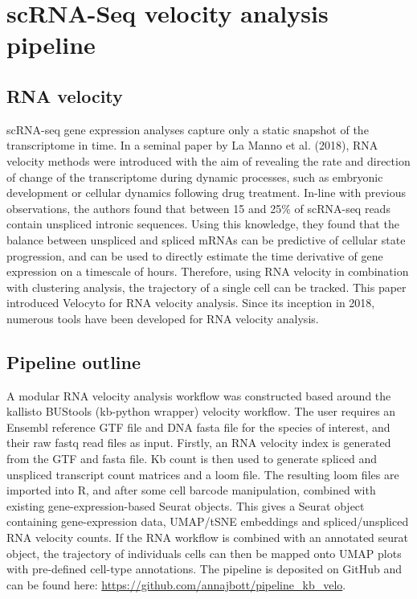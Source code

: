 \afterpage{\clearpage}
\section{scRNA-Seq velocity analysis pipeline}

\subsection{RNA velocity}
scRNA-seq gene expression analyses capture only a static snapshot of the transcriptome in time.
In a seminal paper by La Manno et al. (2018), RNA velocity methods were introduced with the aim of revealing the rate and direction of change of the transcriptome during dynamic processes, such as embryonic development or cellular dynamics following drug treatment\cite{la2018rna}.
In-line with previous observations, the authors found that between 15 and 25\% of scRNA-seq reads contain unspliced intronic sequences.
Using this knowledge, they found that the balance between unspliced and spliced mRNAs can be predictive of cellular state progression, and can be used to directly estimate the time derivative of gene expression on a timescale of hours.
Therefore, using RNA velocity in combination with clustering analysis, the trajectory of a single cell can be tracked.
This paper introduced Velocyto for RNA velocity analysis.
Since its inception in 2018, numerous tools have been developed for RNA velocity analysis\cite{la2018rna, weng2021vetra, bergen2020generalizing, melsted2019modular}.

\subsection{Pipeline outline}
A modular RNA velocity analysis workflow was constructed based around the kallisto BUStools (kb-python wrapper) velocity workflow\cite{melsted2019modular}.
The user requires an Ensembl reference GTF file and DNA fasta file for the species of interest, and their raw fastq read files as input.
Firstly, an RNA velocity index is generated from the GTF and fasta file.
Kb count is then used to generate spliced and unspliced transcript count matrices and a loom file.
The resulting loom files are imported into R, and after some cell barcode manipulation, combined with existing gene-expression-based Seurat objects.
This gives a Seurat object containing gene-expression data, UMAP/tSNE embeddings and spliced/unspliced RNA velocity counts.
If the RNA workflow is combined with an annotated seurat object, the trajectory of individuals cells can then be mapped onto UMAP plots with pre-defined cell-type annotations.
The pipeline is deposited on GitHub and can be found here: \url{https://github.com/annajbott/pipeline_kb_velo}.


